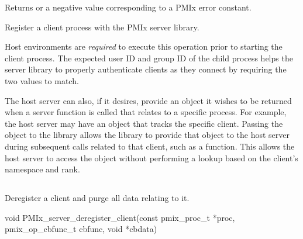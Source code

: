 \begin{arglist}
\end{arglist}

Returns  or a negative value corresponding to a PMIx error constant.

\descr

Register a client process with the PMIx server library.

\advicermstart
Host environments are \textit{required} to execute this operation prior to starting the client process.
The expected user ID and group ID of the child process helps the server library to properly authenticate clients as they connect by requiring the two values to match.
\advicermend

The host server can also, if it desires, provide an object it wishes to be returned when a server function is called that relates to a specific process.
For example, the host server may have an object that tracks the specific client.
Passing the object to the library allows the library to provide that object to the host server during subsequent calls related to that client, such as a  function.  This allows the host server to access the object without performing a lookup based on the client's namespace and rank.


\subsection{}

\summary

Deregister a client and purge all data relating to it.

\format

\cspecificstart
\begin{codepar}
void
PMIx_server_deregister_client(const pmix_proc_t *proc,
                        pmix_op_cbfunc_t cbfunc, void *cbdata)
\end{codepar}
\cspecificend

\begin{arglist}
\end{arglist}


